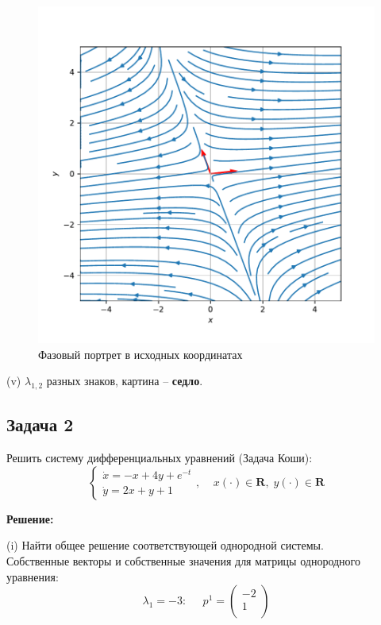 \documentclass[a4paper, 12pt]{article}
\begin{document}
\begin{figure}[H]
	\centering
	\includegraphics[scale=0.7]{2a1_1}
	\caption{Фазовый портрет в исходных координатах}
	\label{im:2a1_1}
\end{figure}

(v) $\lambda_{1,2}$ разных знаков, картина -- \textbf{седло}.


	\subsection* {Задача 2}
 Решить систему дифференциальных уравнений (Задача Коши): 
\begin{equation}
\left\{
\begin{array}{lr}
\dot{x} = -x+4y+e^{-t}\\
\dot{y} = 2x+y+1
\end{array}
\right.
, \;\;\;\; x(\cdot)\in \textbf{R},\; y(\cdot)\in \textbf{R}
\label{eq:23}
\end{equation}

\textbf{Решение:} \par


(i) Найти общее решение соответствующей однородной системы.\\

Собственные векторы и собственные значения для матрицы однородного уравнения:
\[\lambda_1 = -3:\;\;\;\;\; p^1=
\left(
\begin{array}{cc}
-2\\
1\\
\end{array}
\right)  
\]
\end{document}
